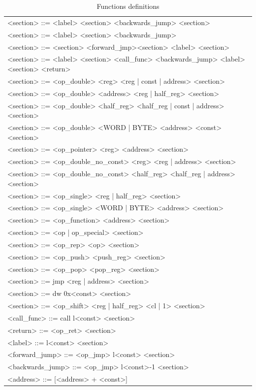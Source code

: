 \documentclass[dvipsnames,format=sigconf,anonymous=true,review=true]{acmart}
\begin{document}
\begin{table}[!ht]
\centering
\begin{tabular}{p{15.6cm}} 
<section> ::= <label> <section> <backwards\_jump> <section>
\\ 
<section> ::= <label> <section> <backwards\_jump>
\\ 
<section> ::= <section> <forward\_jmp><section> <label> <section>
\\ 
<section> ::= <label> <section> <call\_func> <backwards\_jump> <label> <section> <return>
\\ 
<section> ::= <op\_double> <reg>  <reg | const | address> <section>
\\ 
<section> ::= <op\_double> <address> <reg | half\_reg> <section>
\\ 
<section> ::= <op\_double> <half\_reg> <half\_reg | const | address> <section>
\\ 
<section> ::= <op\_double> <WORD | BYTE> <address> <const> <section>
\\ 
<section> ::= <op\_pointer> <reg> <address> <section>
\\ 
<section> ::= <op\_double\_no\_const> <reg> <reg | address> <section>
\\ 
<section> ::= <op\_double\_no\_const> <half\_reg> <half\_reg | address> <section>
\\
<section> ::= <op\_single> <reg | half\_reg> <section>
\\ 
<section> ::= <op\_single> <WORD | BYTE> <address> <section>
\\ 
<section> ::= <op\_function> <address> <section>
\\ 
<section> ::= <op | op\_special> <section>
\\ 
<section> ::= <op\_rep> <op> <section>
\\ 
<section> ::= <op\_push> <push\_reg> <section>
\\ 
<section> ::= <op\_pop> <pop\_reg> <section>
\\ 
<section> ::= jmp <reg | address> <section>
\\ 
<section> ::= dw 0x<const> <section>
\\ 
<section> ::= <op\_shift> <reg | half\_reg> <cl | 1> <section>
\\
<call\_func> ::= call l<const> <section>
\\
<return> ::= <op\_ret> <section>
\\ 
<label> ::= l<const> <section>
\\ 
<forward\_jump> ::= <op\_jmp> l<const> <section>
\\ 
<backwards\_jump> ::= <op\_jmp> l<const>-1 <section>
\\
<address> ::= [<address> + <const>] 
\\ 

\end{tabular}
\caption{Functions definitions}
\label{table2_function_set}
\end{table}
\end{document}
